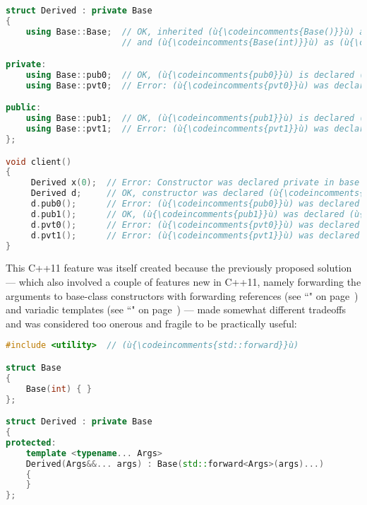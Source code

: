 \begin{lstlisting}[language=C++]
struct Derived : private Base
{
    using Base::Base;  // OK, inherited (ù{\codeincomments{Base()}}ù) as (ù{\codeincomments{public}}ù) constructor
                       // and (ù{\codeincomments{Base(int)}}ù) as (ù{\codeincomments{private}}ù) constructor

private:
    using Base::pub0;  // OK, (ù{\codeincomments{pub0}}ù) is declared (ù{\codeincomments{private}}ù) in derived class.
    using Base::pvt0;  // Error: (ù{\codeincomments{pvt0}}ù) was declared private in base class.

public:
    using Base::pub1;  // OK, (ù{\codeincomments{pub1}}ù) is declared (ù{\codeincomments{public}}ù) in derived class.
    using Base::pvt1;  // Error: (ù{\codeincomments{pvt1}}ù) was declared (ù{\codeincomments{private}}ù) in base class.
};

void client()
{
     Derived x(0);  // Error: Constructor was declared private in base class.
     Derived d;     // OK, constructor was declared (ù{\codeincomments{public}}ù) in base class.
     d.pub0();      // Error: (ù{\codeincomments{pub0}}ù) was declared (ù{\codeincomments{private}}ù) in derived class.
     d.pub1();      // OK, (ù{\codeincomments{pub1}}ù) was declared (ù{\codeincomments{public}}ù) in derived class.
     d.pvt0();      // Error: (ù{\codeincomments{pvt0}}ù) was declared private in base class.
     d.pvt1();      // Error: (ù{\codeincomments{pvt1}}ù) was declared private in base class.
}
\end{lstlisting}

\noindent This C++11 feature was itself created because the previously proposed
solution --- which also involved a couple of features new in C++11, namely
forwarding the arguments to base-class constructors with
forwarding references (see ``" on page~\pageref{forwardingref}) and variadic
templates (see ``" on page~\pageref{variadictemplate}) --- made somewhat different tradeoffs and was
considered too onerous and fragile to be practically useful:

\begin{lstlisting}[language=C++]
#include <utility>  // (ù{\codeincomments{std::forward}}ù)

struct Base
{
    Base(int) { }
};

struct Derived : private Base
{
protected:
    template <typename... Args>
    Derived(Args&&... args) : Base(std::forward<Args>(args)...)
    {
    }
};
\end{lstlisting}

